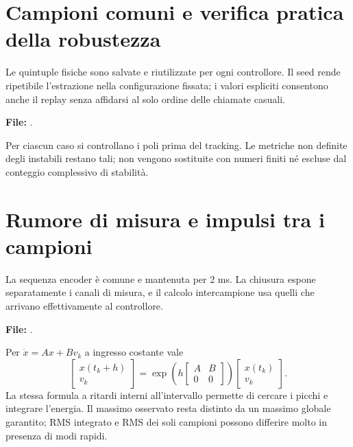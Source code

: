 \section{Campioni comuni e verifica pratica della robustezza}
Le quintuple fisiche sono salvate e riutilizzate per ogni controllore.
Il seed rende ripetibile l'estrazione nella configurazione fissata;
i valori espliciti consentono anche il replay senza affidarsi al solo
ordine delle chiamate casuali.

\par\medskip\noindent\begin{minipage}{\linewidth}
\noindent\textbf{File:} .

\end{minipage}\par\medskip

Per ciascun caso si controllano i poli prima del tracking. Le metriche
non definite degli instabili restano tali; non vengono sostituite con
numeri finiti né escluse dal conteggio complessivo di stabilità.

\section{Rumore di misura e impulsi tra i campioni}
La sequenza encoder è comune e mantenuta per 2 ms. La chiusura espone
separatamente i canali di misura, e il calcolo intercampione usa quelli
che arrivano effettivamente al controllore.

\par\medskip\noindent\begin{minipage}{\linewidth}
\noindent\textbf{File:} .

\end{minipage}\par\medskip

Per $\dot x=Ax+Bv_k$ a ingresso costante vale
\[
\begin{bmatrix}x(t_k+h)\\v_k\end{bmatrix}
=\exp\!\left(h\begin{bmatrix}A&B\\0&0\end{bmatrix}\right)
\begin{bmatrix}x(t_k)\\v_k\end{bmatrix}.
\]
La stessa formula a ritardi interni all'intervallo permette di cercare
i picchi e integrare l'energia. Il massimo osservato resta distinto
da un massimo globale garantito; RMS integrato e RMS dei soli campioni
possono differire molto in presenza di modi rapidi.

